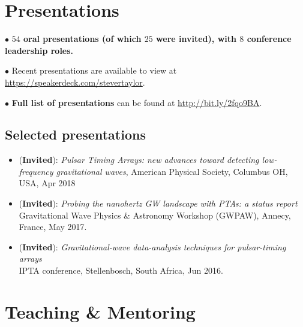 \documentclass[11pt,letterpaper,sans]{moderncv}
\begin{document}
\section{Presentations}

$\bullet$ \textbf{$54$ oral presentations (of which $25$ were invited), with $8$ conference leadership roles.}

$\bullet$ Recent presentations are available to view at {\color{color1} \href{https://speakerdeck.com/stevertaylor}{https://speakerdeck.com/stevertaylor}}.

$\bullet$ \textbf{Full list of presentations} can be found at {\color{color1} \href{http://bit.ly/2fqo9BA}{http://bit.ly/2fqo9BA}}.

\subsection{Selected presentations}

\begin{itemize}[leftmargin=8mm]

\item (\textbf{Invited}): \textit{Pulsar Timing Arrays: new advances toward detecting low-frequency gravitational waves}, American Physical Society, Columbus OH, USA, Apr 2018

\item (\textbf{Invited}): \textit{Probing the nanohertz GW landscape with PTAs: a status report} \\ Gravitational Wave Physics \& Astronomy Workshop (GWPAW), Annecy, France, May 2017.

\item (\textbf{Invited}): \textit{Gravitational-wave data-analysis techniques for pulsar-timing arrays} \\ IPTA conference, Stellenbosch, South Africa, Jun 2016.

\end{itemize}

\section{Teaching \& Mentoring}

\end{document}
